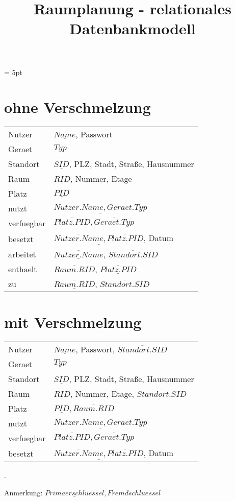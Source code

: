 \documentclass[a4paper,DIV=calc,11pt]{scrartcl}
\begin{document}
\oddsidemargin = 5pt
	
\onehalfspace %
	
\title{Raumplanung - relationales Datenbankmodell}
\maketitle %


\section*{ohne Verschmelzung}
\begin{tabular}{l l}
Nutzer & $\underline{Name}$, Passwort\\
Geraet & $\underline{Typ}$\\
Standort & $\underline{SID}$, PLZ, Stadt, Straße, Hausnummer\\
Raum & $\underline{RID}$, Nummer, Etage\\
Platz & $\underline{PID}$\\
nutzt & $\underline{\overline{Nutzer.Name}, \overline{Geraet.Typ}}$\\
verfuegbar & $\underline{\overline{Platz.PID}, \overline{Geraet.Typ}}$\\
besetzt & $\underline{\overline{Nutzer.Name}, \overline{Platz.PID}}$, Datum\\
arbeitet & $\underline{\overline{Nutzer.Name}}$, $\overline{Standort.SID}$\\
enthaelt & $\overline{Raum.RID}$, $\underline{\overline{Platz.PID}}$\\
zu & $\underline{\overline{Raum.RID}}$, $\overline{Standort.SID}$\\
\end{tabular}

\section*{mit Verschmelzung}
\begin{tabular}{l l}
Nutzer & $\underline{Name}$, Passwort, $\overline{Standort.SID}$\\
Geraet & $\underline{Typ}$\\
Standort & $\underline{SID}$, PLZ, Stadt, Straße, Hausnummer\\
Raum & $\underline{RID}$, Nummer, Etage, $\overline{Standort.SID}$\\
Platz & $\underline{PID},\overline{Raum.RID}$\\
nutzt & $\underline{\overline{Nutzer.Name}, \overline{Geraet.Typ}}$\\
verfuegbar & $\underline{\overline{Platz.PID}, \overline{Geraet.Typ}}$\\
besetzt & $\underline{\overline{Nutzer.Name}, \overline{Platz.PID}}$, Datum\\
\end{tabular}

\begin{spacing}{10}
.\\
\end{spacing}



Anmerkung: $\underline{Primaerschluessel}, \overline{Fremdschluessel}$
\end{document}
